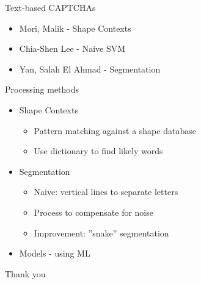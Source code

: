 \documentclass[red]{beamer}
\begin{document}
\begin{frame}{Text-based CAPTCHAs}
  \begin{itemize}
  	\item Mori, Malik - Shape Contexts
	\item Chia-Shen Lee - Naive SVM
	\item Yan, Salah El Ahmad - Segmentation
  \end{itemize}
\end{frame}

\begin{frame}{Processing methods}
  \begin{itemize}
  	\item Shape Contexts
	\begin{itemize}
		\item Pattern matching against a shape database
		\item Use dictionary to find likely words
	\end{itemize}
	\item Segmentation
	\begin{itemize}
		\item Naive: vertical lines to separate letters
		\item Process to compensate for noise
		\item Improvement: ''snake'' segmentation
	\end{itemize}
	\item Models - using ML
  \end{itemize}
\end{frame}

\begin{frame}{Thank you}
  \begin{center}
  \end{center}
\end{frame}
\end{document}

